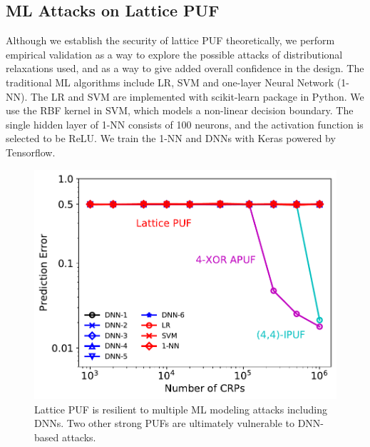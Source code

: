 \subsection{ML Attacks on Lattice PUF}


Although we establish the security of lattice PUF theoretically, we perform empirical validation as a way to explore the possible attacks of distributional relaxations used, and as a way to give added overall confidence in the design. The traditional ML algorithms include LR, SVM and one-layer Neural Network (1-NN). The LR and SVM are implemented with scikit-learn package in Python. We use the RBF kernel in SVM, which models a non-linear decision boundary. The single hidden layer of 1-NN consists of 100 neurons, and the activation function is selected to be ReLU. We train the 1-NN and DNNs with Keras powered by Tensorflow.


\begin{figure}[t!]
\centering
\includegraphics[width = 0.7\linewidth]{./figs/ml_attack_dnn_all_puf_5_new.pdf}
\caption{Lattice PUF is resilient to multiple ML modeling attacks including DNNs. Two other strong PUFs are ultimately vulnerable to DNN-based attacks.}
\label{fig:ml_attack_2}
\end{figure}

